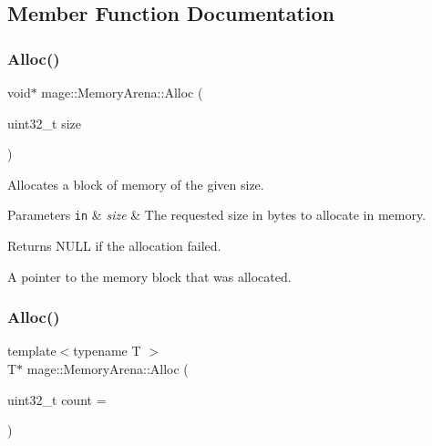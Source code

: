 \subsection{Member Function Documentation}
\hypertarget{classmage_1_1_memory_arena_a01e00ac6e109249bd80a1e9e79eb0b28}{}\label{classmage_1_1_memory_arena_a01e00ac6e109249bd80a1e9e79eb0b28} 
\subsubsection{\texorpdfstring{Alloc()}{Alloc()}\hspace{0.1cm}{\footnotesize\ttfamily [1/2]}}
{\footnotesize\ttfamily void$\ast$ mage\+::\+Memory\+Arena\+::\+Alloc (\begin{DoxyParamCaption}\item[{uint32\+\_\+t}]{size }\end{DoxyParamCaption})}

Allocates a block of memory of the given size.


\begin{DoxyParams}[1]{Parameters}
\mbox{\tt in}  & {\em size} & The requested size in bytes to allocate in memory. \\
\hline
\end{DoxyParams}
\begin{DoxyReturn}{Returns}
{\ttfamily N\+U\+LL} if the allocation failed. 

A pointer to the memory block that was allocated. 
\end{DoxyReturn}
\hypertarget{classmage_1_1_memory_arena_a16431dbfc49ddaee803fb0ab52303302}{}\label{classmage_1_1_memory_arena_a16431dbfc49ddaee803fb0ab52303302} 
\subsubsection{\texorpdfstring{Alloc()}{Alloc()}\hspace{0.1cm}{\footnotesize\ttfamily [2/2]}}
{\footnotesize\ttfamily template$<$typename T $>$ \\
T$\ast$ mage\+::\+Memory\+Arena\+::\+Alloc (\begin{DoxyParamCaption}\item[{uint32\+\_\+t}]{count = {} }\end{DoxyParamCaption})}

